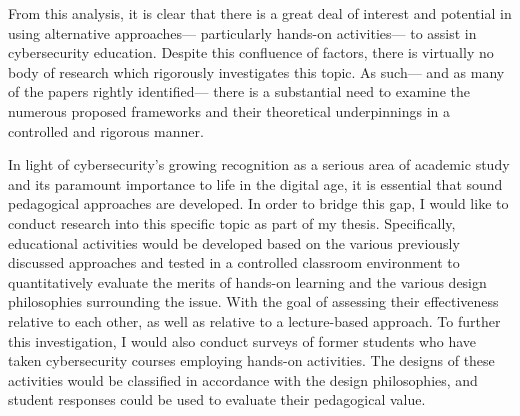 \ifshowconclusion
{}

    From this analysis, it is clear that there is a great deal of interest and potential in using alternative approaches---%
particularly hands-on activities---%
to assist in cybersecurity education. %
Despite this confluence of factors, there is virtually no body of research which rigorously investigates this topic. %
As such---%
and as many of the papers rightly identified---%
there is a substantial need to examine the numerous proposed frameworks and their theoretical underpinnings in a controlled and rigorous manner. 

    In light of cybersecurity's growing recognition as a serious area of academic study and its paramount importance to life in the digital age, it is essential that sound pedagogical approaches are developed. %
In order to bridge this gap, I would like to conduct research into this specific topic as part of my thesis. %
Specifically, educational activities would be developed based on the various previously discussed approaches and tested in a controlled classroom environment to quantitatively evaluate the merits of hands-on learning and the various design philosophies surrounding the issue. %
With the goal of assessing their effectiveness relative to each other, as well as relative to a lecture-based approach. %
To further this investigation, I would also conduct surveys of former students who have taken cybersecurity courses employing hands-on activities. %
The designs of these activities would be classified in accordance with the design philosophies, and student responses could be used to evaluate their pedagogical value. %
 
\fi